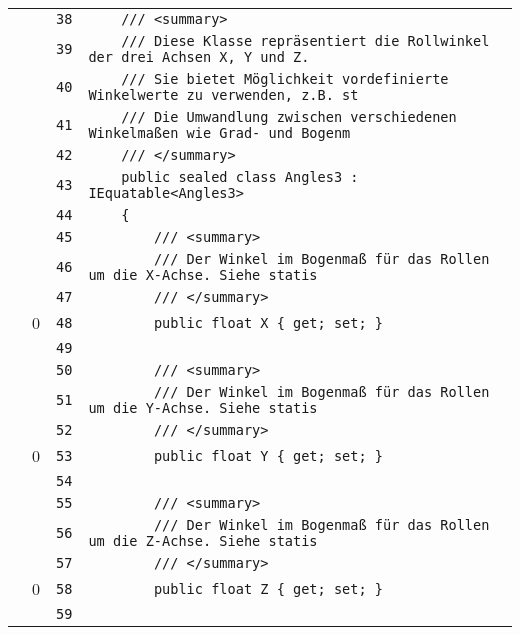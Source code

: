 \documentclass[a4paper,10pt]{article}
\begin{document}
\begin{longtable}[l]{lrrl}
\cellcolor{gray} &  & \verb~38~ & \verb~    /// <summary>~\\
\cellcolor{gray} &  & \verb~39~ & \verb~    /// Diese Klasse repräsentiert die Rollwinkel der drei Achsen X, Y und Z.~\\
\cellcolor{gray} &  & \verb~40~ & \verb~    /// Sie bietet Möglichkeit vordefinierte Winkelwerte zu verwenden, z.B. st~\\
\cellcolor{gray} &  & \verb~41~ & \verb~    /// Die Umwandlung zwischen verschiedenen Winkelmaßen wie Grad- und Bogenm~\\
\cellcolor{gray} &  & \verb~42~ & \verb~    /// </summary>~\\
\cellcolor{gray} &  & \verb~43~ & \verb~    public sealed class Angles3 : IEquatable<Angles3>~\\
\cellcolor{gray} &  & \verb~44~ & \verb~    {~\\
\cellcolor{gray} &  & \verb~45~ & \verb~        /// <summary>~\\
\cellcolor{gray} &  & \verb~46~ & \verb~        /// Der Winkel im Bogenmaß für das Rollen um die X-Achse. Siehe statis~\\
\cellcolor{gray} &  & \verb~47~ & \verb~        /// </summary>~\\
\cellcolor{red} & 0 & \verb~48~ & \verb~        public float X { get; set; }~\\
\cellcolor{gray} &  & \verb~49~ & \verb~~\\
\cellcolor{gray} &  & \verb~50~ & \verb~        /// <summary>~\\
\cellcolor{gray} &  & \verb~51~ & \verb~        /// Der Winkel im Bogenmaß für das Rollen um die Y-Achse. Siehe statis~\\
\cellcolor{gray} &  & \verb~52~ & \verb~        /// </summary>~\\
\cellcolor{red} & 0 & \verb~53~ & \verb~        public float Y { get; set; }~\\
\cellcolor{gray} &  & \verb~54~ & \verb~~\\
\cellcolor{gray} &  & \verb~55~ & \verb~        /// <summary>~\\
\cellcolor{gray} &  & \verb~56~ & \verb~        /// Der Winkel im Bogenmaß für das Rollen um die Z-Achse. Siehe statis~\\
\cellcolor{gray} &  & \verb~57~ & \verb~        /// </summary>~\\
\cellcolor{red} & 0 & \verb~58~ & \verb~        public float Z { get; set; }~\\
\cellcolor{gray} &  & \verb~59~ & \verb~~\\

\end{longtable}
\end{document}

